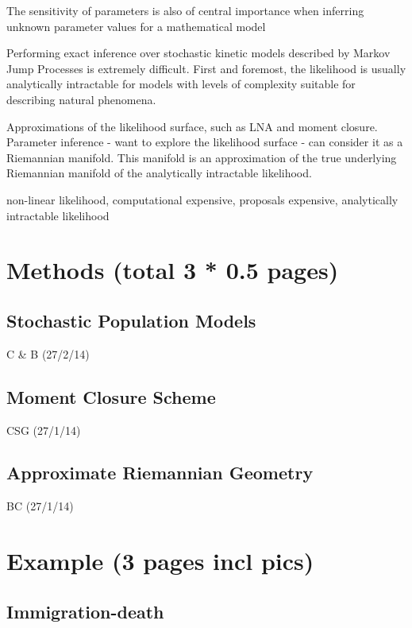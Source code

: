 \documentclass{pnastwo}
\begin{document}
\begin{article}
The sensitivity of parameters is also of central importance when inferring
unknown parameter values for a mathematical model

Performing exact inference over stochastic kinetic models described by Markov
Jump Processes is extremely difficult. First and foremost, the likelihood is
usually analytically intractable for models with levels of complexity suitable
for describing natural phenomena.

Approximations of the likelihood surface, such as LNA and moment closure.
Parameter inference - want to explore the likelihood surface - can consider it
as a Riemannian manifold. This manifold is an approximation of the true
underlying Riemannian manifold of the analytically intractable likelihood.

non-linear likelihood, computational expensive, proposals expensive,
analytically intractable likelihood



\section{Methods (total 3 * 0.5 pages)}

\subsection{Stochastic Population Models}

C \& B (27/2/14) 

\subsection{Moment Closure Scheme}

CSG (27/1/14)

\subsection{Approximate Riemannian Geometry}

BC (27/1/14)




\section{Example (3 pages incl pics)}

\subsection{Immigration-death}


\end{article}
\end{document}
